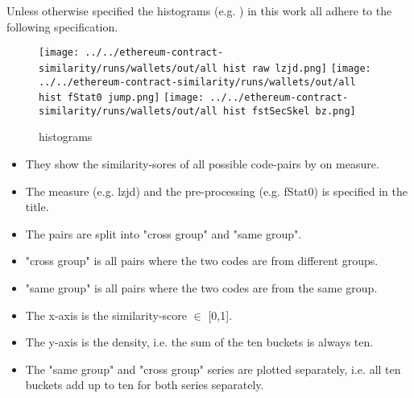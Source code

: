 \documentclass[../main.tex]{subfiles}
\begin{document}
Unless otherwise specified the histograms (e.g. ) in this work all adhere to the following specification.

\begin{figure}[ht!]
  \centering
  \texttt{[image: ../../ethereum-contract-similarity/runs/wallets/out/all hist raw lzjd.png]}%
  \texttt{[image: ../../ethereum-contract-similarity/runs/wallets/out/all hist fStat0 jump.png]}%
  \texttt{[image: ../../ethereum-contract-similarity/runs/wallets/out/all hist fstSecSkel bz.png]}%

  \caption{histograms}
  \label{fig:histograms}
\end{figure}

\begin{itemize}
  \item They show the similarity-sores of all possible code-pairs by on measure.
  \item The measure (e.g. lzjd) and the pre-processing (e.g. fStat0) is specified in the title.
  \item The pairs are split into "cross group" and "same group".
  \item "cross group" is all pairs where the two codes are from different groups.
  \item "same group" is all pairs where the two codes are from the same group.
  \item The x-axis is the similarity-score \(\in\) [0,1].
  \item The y-axis is the density, i.e. the sum of the ten buckets is always ten.
  \item The "same group" and "cross group" series are plotted separately, i.e. all ten buckets add up to ten for both series separately.
\end{itemize}
\end{document}

